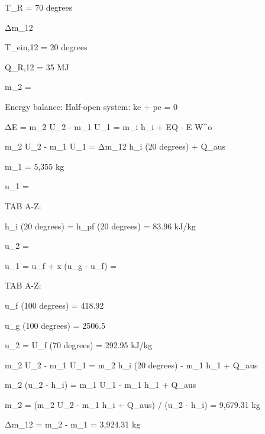 T_R = 70 degrees

Δm_12

T_ein,12 = 20 degrees

Q_R,12 = 35 MJ

m_2 = 

Energy balance: Half-open system: ke + pe = 0

ΔE = m_2 U_2 - m_1 U_1 = m_i h_i + EQ - E W^o

m_2 U_2 - m_1 U_1 = Δm_12 h_i (20 degrees) + Q_aus

m_1 = 5,355 kg

u_1 = 

TAB A-Z: 

h_i (20 degrees) = h_pf (20 degrees) = 83.96 kJ/kg

u_2 = 

u_1 = u_f + x (u_g - u_f) = 

TAB A-Z: 

u_f (100 degrees) = 418.92

u_g (100 degrees) = 2506.5

u_2 = U_f (70 degrees) = 292.95 kJ/kg

m_2 U_2 - m_1 U_1 = m_2 h_i (20 degrees) - m_1 h_1 + Q_aus

m_2 (u_2 - h_i) = m_1 U_1 - m_1 h_1 + Q_aus

m_2 = (m_2 U_2 - m_1 h_i + Q_aus) / (u_2 - h_i) = 9,679.31 kg

Δm_12 = m_2 - m_1 = 3,924.31 kg